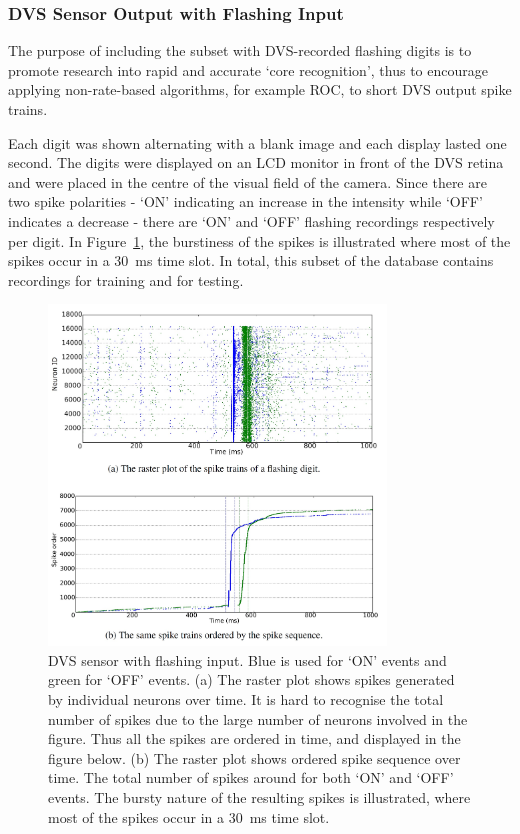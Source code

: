 \subsubsection{DVS Sensor Output with Flashing Input}
\label{subsec_flash}
The purpose of including the subset with DVS-recorded flashing digits is to promote research into rapid and accurate `core recognition', thus to encourage applying non-rate-based algorithms, for example ROC, to short DVS output spike trains.

Each digit was shown alternating with a blank image and each display lasted one second.
The digits were displayed on an LCD monitor in front of the DVS retina~\citep{serrano2013128} and were placed in the centre of the visual field of the camera.
Since there are two spike polarities - `ON' indicating an increase in the intensity while `OFF' indicates a decrease - there are `ON' and `OFF' flashing recordings respectively per digit.
In Figure~\ref{fig:flash}, the burstiness of the spikes is illustrated where most of the spikes occur in a 30~ms time slot. 
In total, this subset of the database contains \protect{} \protect{} recordings for training and \protect{} \protect{} for testing.

\begin{figure}[tbh!]
	\centering
	\includegraphics[width=0.8\textwidth]{pics_bench/fig5.jpg}	
	\caption{DVS sensor with flashing input.
		Blue is used for `ON' events and green for `OFF' events.
		(a) The raster plot shows spikes generated by individual neurons over time.
		It is hard to recognise the total number of spikes due to the large number of neurons involved in the figure.
		Thus all the spikes are ordered in time, and displayed in the figure below.
		(b) The raster plot shows \protect{} ordered spike sequence over time.
		The total number of spikes \protect{} \protect{} around \protect{} \protect{} for both `ON' and `OFF' events.
		The bursty nature of the resulting spikes is illustrated, where most of the spikes occur in a 30~ms time slot.}
	\label{fig:flash}
\end{figure}


